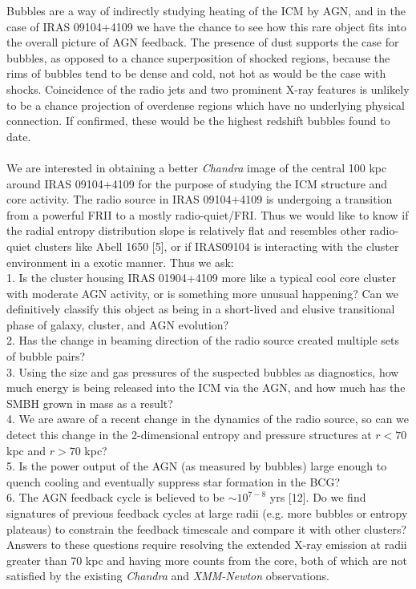 \documentclass[letterpaper,11pt,twocolumn]{article}
\begin{document}
Bubbles are a way of indirectly studying heating of the ICM by AGN,
and in the case of IRAS 09104+4109 we have the chance to see how this
rare object fits into the overall picture of AGN feedback. The
presence of dust supports the case for bubbles, as opposed to a chance
superposition of shocked regions, because the rims of bubbles
tend to be dense and cold, not hot as would be the case with
shocks. Coincidence of the radio jets and two prominent X-ray features
is unlikely to be a chance projection of overdense regions which have
no underlying physical connection. If confirmed, these would be the
highest redshift bubbles found to date.\\

\\
We are interested in obtaining a better {\it{Chandra}} image of
the central 100 kpc around IRAS 09104+4109 for the purpose of studying
the ICM structure and core activity. The radio
source in IRAS 09104+4109 is undergoing a transition from a powerful
FRII to a mostly radio-quiet/FRI. Thus we would like to know if the radial
entropy distribution slope is relatively flat and resembles other
radio-quiet clusters like Abell 1650 [5], or if IRAS09104 is
interacting with the cluster environment in a exotic manner. Thus we ask:\\
1. Is the cluster housing IRAS 01904+4109 more like a typical cool
core cluster with moderate AGN activity, or is something more
unusual happening? Can we definitively
classify this object as being in a short-lived and elusive
transitional phase of galaxy, cluster, and AGN evolution?\\
2. Has the change in beaming direction of the radio source created
multiple sets of bubble pairs?\\
3. Using the size and gas pressures of the suspected bubbles as
diagnostics, how much energy is being released into the ICM via the
AGN, and how much has the SMBH grown in mass as a result?\\
4. We are aware of a recent change in the dynamics of the radio
source, so can we detect this change in the 2-dimensional entropy and
pressure structures at $r < 70$ kpc and $r > 70$ kpc?\\
5. Is the power output of the AGN (as measured by bubbles) large
enough to quench cooling and eventually suppress star formation in
the BCG?\\
6. The AGN feedback cycle is believed to be $\sim 10^{7-8}$ yrs
[12]. Do we find signatures of previous feedback
cycles at large radii (e.g. more bubbles or entropy plateaus) to
constrain the feedback timescale and compare it with other clusters?\\
Answers to these questions require resolving the extended X-ray
emission at radii greater than 70 kpc and having more counts from the
core, both of which are not satisfied by the existing
{\textit{Chandra}} and {\it{XMM-Newton}} observations.\\
\end{document}
